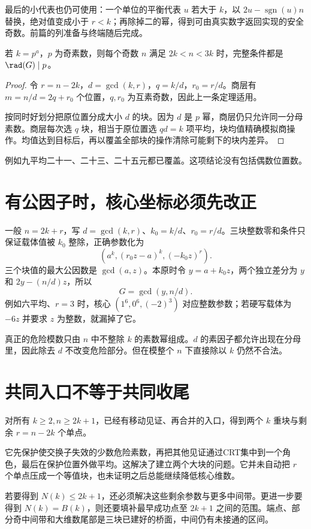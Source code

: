 最后的小代表也仍可使用：一个单位的平衡代表 $u$ 若大于 $k$，以 $2u-\operatorname{sgn}(u)n$ 替换，绝对值变成小于 $r<k$；再除掉二的幂，得到可由真实数字返回实现的安全奇数。前篇的列准备与终端随后完成。

\begin{corollary}[奇素数幂的全部奇中间维数]
若 $k=p^a$，$p$ 为奇素数，则每个奇数 $n$ 满足 $2k<n<3k$ 时，完整条件都是 $\rad(G)\mid p$。
\end{corollary}
\begin{proof}
令 $r=n-2k$，$d=\gcd(k,r)$，$q=k/d$，$r_0=r/d$。商层有 $m=n/d=2q+r_0$ 个位置，$q,r_0$ 为互素奇数，因此上一条定理适用。

按同时好划分把原位置分成大小 $d$ 的块。因为 $d$ 是 $p$ 幂，商层仍只允许同一分母素数。商层每次选 $q$ 块，相当于原位置选 $qd=k$ 项平均，块均值精确模拟商操作。均值达到目标后，再以覆盖全部块的操作清除可能剩下的块内差异。
\end{proof}
例如九平均二十一、二十三、二十五元都已覆盖。这项结论没有包括偶数位置数。

\section{有公因子时，核心坐标必须先改正}
一般 $n=2k+r$，写 $d=\gcd(k,r)$、$k_0=k/d$、$r_0=r/d$。三块整数零和条件只保证载体值被 $k_0$ 整除，正确参数化为
\[(a^k,(r_0z-a)^k,(-k_0z)^r).
\]
三个块值的最大公因数是 $\gcd(a,z)$。本原时令 $y=a+k_0z$，两个独立差分为 $y$ 和 $2y-(n/d)z$，所以
\[G=\gcd(y,n/d).
\]
例如六平均、$r=3$ 时，核心 $(1^6,0^6,(-2)^3)$ 对应整数参数；若硬写载体为 $-6z$ 并要求 $z$ 为整数，就漏掉了它。

真正的危险模数只由 $n$ 中不整除 $k$ 的素数幂组成。$d$ 的素因子都允许出现在分母里，因此除去 $d$ 不改变危险部分。但在模整个 $n$ 下直接除以 $k$ 仍然不合法。

\section{共同入口不等于共同收尾}
对所有 $k\ge2,n\ge2k+1$，已经有移动见证、再合并的入口，得到两个 $k$ 重块与剩余 $r=n-2k$ 个单点。

它先保护使交换子失效的少数危险素数，再把其他见证通过CRT集中到一个角色，最后在保护位置外做平均。这解决了建立两个大块的问题。它并未自动把 $r$ 个单点压成一个等值块，也未证明之后总能继续降低核心维数。

若要得到 $N(k)\le2k+1$，还必须解决这些剩余参数与更多中间带。更进一步要得到 $N(k)=B(k)$，则还要填补最早成功点至 $2k+1$ 之间的范围。端点、部分奇中间带和大维数尾部是三块已建好的桥面，中间仍有未接通的区间。
